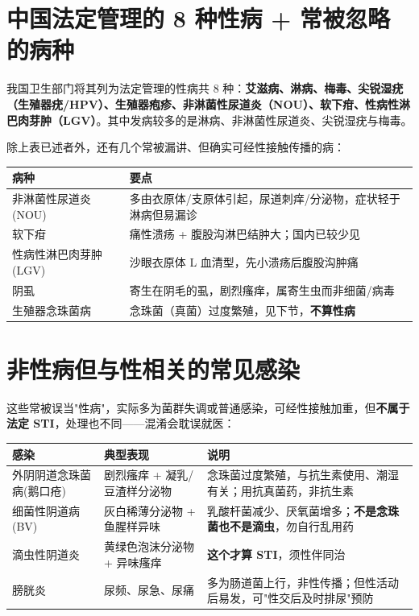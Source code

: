\documentclass[12pt,UTF8,openany]{ctexbook}
\begin{document}
\section{中国法定管理的 8 种性病 + 常被忽略的病种}

\noindent 我国卫生部门将其列为法定管理的性病共 8 种：\textbf{艾滋病、淋病、梅毒、尖锐湿疣（生殖器疣/HPV）、生殖器疱疹、非淋菌性尿道炎（NOU）、软下疳、性病性淋巴肉芽肿（LGV）}。其中发病较多的是淋病、非淋菌性尿道炎、尖锐湿疣与梅毒。

\noindent 除上表已述者外，还有几个常被漏讲、但确实可经性接触传播的病：

\begin{tabularx}{\textwidth}{lX}
\toprule
病种 & 要点 \\
\midrule
非淋菌性尿道炎(NOU) & 多由衣原体/支原体引起，尿道刺痒/分泌物，症状轻于淋病但易漏诊 \\
软下疳 & 痛性溃疡 + 腹股沟淋巴结肿大；国内已较少见 \\
性病性淋巴肉芽肿(LGV) & 沙眼衣原体 L 血清型，先小溃疡后腹股沟肿痛 \\
阴虱 & 寄生在阴毛的虱，剧烈瘙痒，属寄生虫而非细菌/病毒 \\
生殖器念珠菌病 & 念珠菌（真菌）过度繁殖，见下节，\textbf{不算性病} \\
\bottomrule
\end{tabularx}

\section{非性病但与性相关的常见感染}

\noindent 这些常被误当"性病"，实际多为菌群失调或普通感染，可经性接触加重，但\textbf{不属于法定 STI}，处理也不同——混淆会耽误就医：

\begin{tabularx}{\textwidth}{l X X}
\toprule
感染 & 典型表现 & 说明 \\
\midrule
外阴阴道念珠菌病(鹅口疮) & 剧烈瘙痒 + 凝乳/豆渣样分泌物 & 念珠菌过度繁殖，与抗生素使用、潮湿有关；用抗真菌药，非抗生素 \\
细菌性阴道病(BV) & 灰白稀薄分泌物 + 鱼腥样异味 & 乳酸杆菌减少、厌氧菌增多；\textbf{不是念珠菌也不是滴虫}，勿自行乱用药 \\
滴虫性阴道炎 & 黄绿色泡沫分泌物 + 异味瘙痒 & \textbf{这个才算 STI}，须性伴同治 \\
膀胱炎 & 尿频、尿急、尿痛 & 多为肠道菌上行，非性传播；但性活动后易发，可"性交后及时排尿"预防 \\
\bottomrule
\end{tabularx}
\end{document}
